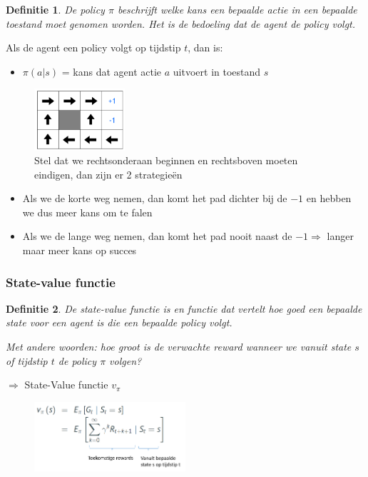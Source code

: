 \documentclass{article}
\newtheorem{theorem}{Definitie}[section]
\begin{document}
\begin{theorem}
    De policy $\pi$ beschrijft welke kans een bepaalde actie in een bepaalde toestand 
    moet genomen worden. Het is de bedoeling dat de agent de policy volgt.
\end{theorem}

Als de agent een policy volgt op tijdstip $t$, dan is:

\begin{itemize}
    \item $\pi(a|s)$ = kans dat agent actie $a$ uitvoert in toestand $s$
\end{itemize}

\begin{figure}[H]
    \centering
    \includegraphics[width=0.3\textwidth]{policy.png}
    \caption{Stel dat we rechtsonderaan beginnen en rechtsboven moeten eindigen, dan zijn er 2 strategieën}
\end{figure}

\begin{itemize}
    \item Als we de korte weg nemen, dan komt het pad dichter bij de $-1$ en hebben we dus meer kans om te falen
    \item Als we de lange weg nemen, dan komt het pad nooit naast de $-1 \Rightarrow$ langer maar meer kans op succes
\end{itemize}

\subsubsection{State-value functie}

\begin{theorem}
    De state-value functie is en functie dat vertelt hoe goed een bepaalde state
    voor een agent is die een bepaalde policy volgt.

    Met andere woorden: hoe groot is de verwachte reward wanneer we vanuit state $s$
    of tijdstip $t$ de policy $\pi$ volgen?
\end{theorem}

$\Rightarrow$ State-Value functie $v_{\pi}$


\begin{figure}[H]
    \centering
    \includegraphics[width=0.5\textwidth]{state-value-function.png}
\end{figure}
\end{document}
